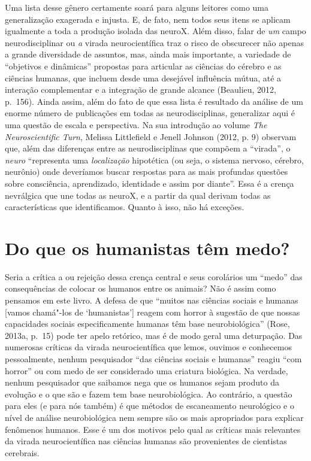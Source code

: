 Uma lista desse gênero certamente soará para alguns leitores como uma
generalização exagerada e injusta. E, de fato, nem todos seus itens se
aplicam igualmente a toda a produção isolada das neuroX. Além disso,
falar de \emph{um} campo neurodisciplinar ou \emph{a} virada
neurocientífica traz o risco de obscurecer não apenas a grande
diversidade de assuntos, mas, ainda mais importante, a variedade de
``objetivos e dinâmicas'' propostas para articular as ciências do
cérebro e as ciências humanas, que incluem desde uma desejável
influência mútua, até a interação complementar e a integração de grande
alcance (Beaulieu, 2012, p.~156). Ainda assim, além do fato de que essa
lista é resultado da análise de um enorme número de publicações em todas
as neurodisciplinas, generalizar aqui é uma questão de escala e
perspectiva. Na sua introdução ao volume \emph{The Neuroscientific
Turn}, Melissa Littlefield e Jenell Johnson (2012, p. 9) observam que,
além das diferenças entre as neurodisciplinas que compõem a ``virada'',
o \emph{neuro} ``representa uma \emph{localização} hipotética (ou seja,
o sistema nervoso, cérebro, neurônio) onde deveríamos buscar respostas
para as mais profundas questões sobre consciência, aprendizado,
identidade e assim por diante''. Essa é a crença nevrálgica que une
todas as neuroX, e a partir da qual derivam todas as características que
identificamos. Quanto à isso, não há exceções.

\section{Do que os humanistas têm medo?}

Seria a crítica a ou rejeição dessa crença central e seus corolários um
``medo'' das consequências de colocar os humanos entre os animais? Não é
assim como pensamos em este livro. A defesa de que ``muitos nas ciências
sociais e humanas {[}vamos chamá"-los de `humanistas'{]} reagem com
horror à sugestão de que nossas capacidades sociais especificamente
humanas têm base neurobiológica'' (Rose, 2013a, p.~15) pode ter apelo
retórico, mas é de modo geral uma deturpação. Das numerosas críticas da
virada neurocientífica que lemos, ouvimos e conhecemos pessoalmente,
nenhum pesquisador ``das ciências sociais e humanas'' reagiu ``com
horror'' ou com medo de ser considerado uma criatura biológica. Na
verdade, nenhum pesquisador que saibamos nega que os humanos sejam
produto da evolução e o que são e fazem tem base neurobiológica. Ao
contrário, a questão para eles (e para nós também) é que métodos de
escaneamento neurológico e o nível de análise neurobiológica nem sempre
são os mais apropriados para explicar fenômenos humanos. Esse é um dos
motivos pelo qual as críticas mais relevantes da virada neurocientífica
nas ciências humanas são provenientes de cientistas cerebrais.

